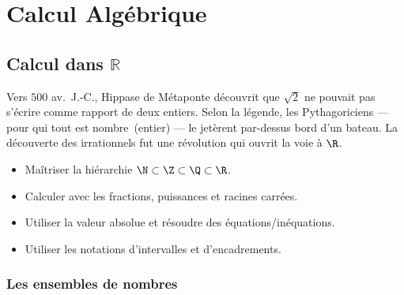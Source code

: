 \part{Calcul Alg\'ebrique}

\chapter{Calcul dans $\mathbb{R}$}


\begin{anecdote}
Vers $500$ av.\ J.-C., Hippase de M\'etaponte d\'ecouvrit que $\sqrt{2}$ ne pouvait
pas s'\'ecrire comme rapport de deux entiers. Selon la l\'egende, les Pythagoriciens
--- pour qui \og tout est nombre\fg\ (entier) --- le jet\`erent par-dessus bord d'un
bateau. La d\'ecouverte des irrationnels fut une r\'evolution qui ouvrit la voie \`a $\R$.
\end{anecdote}

\begin{objectifs}
\begin{itemize}
  \item Ma\^itriser la hi\'erarchie $\N \subset \Z \subset \Q \subset \R$.
  \item Calculer avec les fractions, puissances et racines carr\'ees.
  \item Utiliser la valeur absolue et r\'esoudre des \'equations/in\'equations.
  \item Utiliser les notations d'intervalles et d'encadrements.
\end{itemize}
\end{objectifs}

\section{Les ensembles de nombres}

